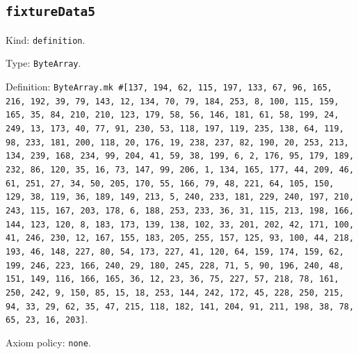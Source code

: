 \documentclass[11pt]{article}
\begin{document}
\subsection*{\texttt{fixtureData5}}
\noindent Kind: \texttt{definition}.\par
\noindent Type: \texttt{ByteArray}.\par
\noindent Definition: \texttt{ByteArray.mk \#[137, 194, 62, 115, 197, 133, 67, 96, 165, 216, 192, 39, 79, 143, 12, 134, 70, 79, 184, 253, 8, 100, 115, 159, 165, 35, 84, 210, 210, 123, 179, 58, 56, 146, 181, 61, 58, 199, 24, 249, 13, 173, 40, 77, 91, 230, 53, 118, 197, 119, 235, 138, 64, 119, 98, 233, 181, 200, 118, 20, 176, 19, 238, 237, 82, 190, 20, 253, 213, 134, 239, 168, 234, 99, 204, 41, 59, 38, 199, 6, 2, 176, 95, 179, 189, 232, 86, 120, 35, 16, 73, 147, 99, 206, 1, 134, 165, 177, 44, 209, 46, 61, 251, 27, 34, 50, 205, 170, 55, 166, 79, 48, 221, 64, 105, 150, 129, 38, 119, 36, 189, 149, 213, 5, 240, 233, 181, 229, 240, 197, 210, 243, 115, 167, 203, 178, 6, 188, 253, 233, 36, 31, 115, 213, 198, 166, 144, 123, 120, 8, 183, 173, 139, 138, 102, 33, 201, 202, 42, 171, 100, 41, 246, 230, 12, 167, 155, 183, 205, 255, 157, 125, 93, 100, 44, 218, 193, 46, 148, 227, 80, 54, 173, 227, 41, 120, 64, 159, 174, 159, 62, 199, 246, 223, 166, 240, 29, 180, 245, 228, 71, 5, 90, 196, 240, 48, 151, 149, 116, 166, 165, 36, 12, 23, 36, 75, 227, 57, 218, 78, 161, 250, 242, 9, 150, 85, 15, 18, 253, 144, 242, 172, 45, 228, 250, 215, 94, 33, 29, 62, 35, 47, 215, 118, 182, 141, 204, 91, 211, 198, 38, 78, 65, 23, 16, 203]}.\par
\noindent Axiom policy: \texttt{none}.\par
\end{document}
